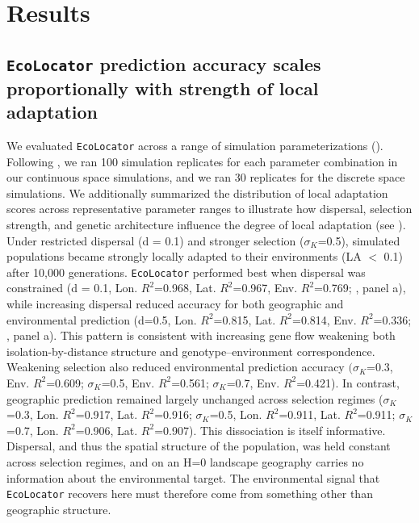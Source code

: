 \documentclass[]{article}
\newcommand{\ecolocator}{\texttt{EcoLocator}\xspace}
\begin{document}
\section{Results}

\subsection{\ecolocator prediction accuracy scales proportionally
with strength of local adaptation}

We evaluated \ecolocator
across a range of simulation parameterizations ().
Following \citet{booker_wza_2024},
we ran 100 simulation replicates for each parameter combination in our continuous space simulations,
and we ran 30 replicates for the discrete space simulations.
We additionally summarized
the distribution of local adaptation scores
across representative parameter ranges to illustrate
how dispersal, selection strength, and genetic architecture
influence the degree of local adaptation (see ).
Under restricted dispersal (d = 0.1) and
stronger selection (\(\sigma_K\)=0.5),
simulated populations became strongly locally adapted
to their environments (LA $<$ 0.1) after 10,000 generations. 
\ecolocator performed best when dispersal was constrained
(d = 0.1, Lon. $R^2$=0.968, Lat. $R^2$=0.967, Env. $R^2$=0.769;
, panel a),
while increasing dispersal reduced accuracy
for both geographic and environmental prediction 
(d=0.5, Lon. $R^2$=0.815, Lat. $R^2$=0.814, Env. $R^2$=0.336; 
, panel a).
This pattern is consistent with increasing gene flow weakening both
isolation-by-distance structure and genotype--environment correspondence.
Weakening selection also reduced environmental prediction accuracy 
\((\sigma_K\)=0.3, Env. $R^2$=0.609;
\(\sigma_K\)=0.5, Env. $R^2$=0.561;
\(\sigma_K\)=0.7, Env. $R^2$=0.421).
In contrast, geographic prediction remained largely unchanged
across selection regimes 
(\(\sigma_K\)=0.3, Lon. $R^2$=0.917, Lat. $R^2$=0.916;
 \(\sigma_K\)=0.5, Lon. $R^2$=0.911, Lat. $R^2$=0.911;
 \(\sigma_K\)=0.7, Lon. $R^2$=0.906, Lat. $R^2$=0.907).
This dissociation is itself informative.
Dispersal, and thus the spatial structure of the population,
was held constant across selection regimes,
and on an H=0 landscape geography carries no information about the environmental target.
The environmental signal that \ecolocator recovers here
must therefore come from something other than geographic structure.
\end{document}
